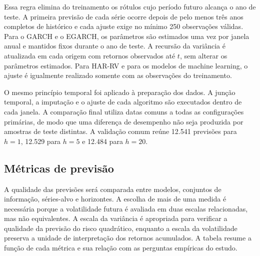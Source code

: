 \documentclass[a4paper,fleqn]{cas-sc}
\begin{document}
Essa regra elimina do treinamento os rótulos cujo período futuro alcança o ano de teste. A primeira previsão de cada série ocorre depois de pelo menos três anos completos de histórico e cada ajuste exige no mínimo 250 observações válidas. Para o GARCH e o EGARCH, os parâmetros são estimados uma vez por janela anual e mantidos fixos durante o ano de teste. A recursão da variância é atualizada em cada origem com retornos observados até \(t\), sem alterar os parâmetros estimados. Para HAR-RV e para os modelos de machine learning, o ajuste é igualmente realizado somente com as observações do treinamento.

O mesmo princípio temporal foi aplicado à preparação dos dados. A junção temporal, a imputação e o ajuste de cada algoritmo são executados dentro de cada janela. A comparação final utiliza datas comuns a todas as configurações primárias, de modo que uma diferença de desempenho não seja produzida por amostras de teste distintas. A validação comum reúne 12.541 previsões para \(h=1\), 12.529 para \(h=5\) e 12.484 para \(h=20\).

\subsection{Métricas de previsão}
\label{subsec:metrics}

A qualidade das previsões será comparada entre modelos, conjuntos de informação, séries-alvo e horizontes. A escolha de mais de uma medida é necessária porque a volatilidade futura é avaliada em duas escalas relacionadas, mas não equivalentes. A escala da variância é apropriada para verificar a qualidade da previsão do risco quadrático, enquanto a escala da volatilidade preserva a unidade de interpretação dos retornos acumulados. A tabela resume a função de cada métrica e sua relação com as perguntas empíricas do estudo.
\end{document}

